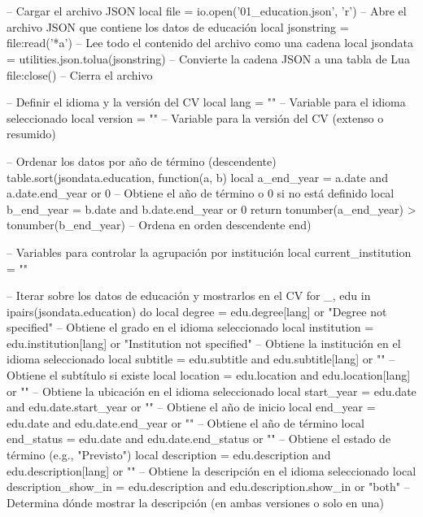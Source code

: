\section*{\educationTitle} %
\vspace{-20pt}
\noindent\makebox[\linewidth]{\rule{\textwidth}{0.4pt}} %
\vspace{-10pt}

\setlength{\leftskip}{0pt} %
\setlength{\rightskip}{0pt plus 1fil} %
\raggedright %

\begin{luacode}
-- Cargar el archivo JSON
local file = io.open('01_education.json', 'r') -- Abre el archivo JSON que contiene los datos de educación
local jsonstring = file:read('*a') -- Lee todo el contenido del archivo como una cadena
local jsondata = utilities.json.tolua(jsonstring) -- Convierte la cadena JSON a una tabla de Lua
file:close() -- Cierra el archivo

-- Definir el idioma y la versión del CV
local lang = "\cvLang" -- Variable para el idioma seleccionado
local version = "\cvVersion" -- Variable para la versión del CV (extenso o resumido)

-- Ordenar los datos por año de término (descendente)
table.sort(jsondata.education, function(a, b)
    local a_end_year = a.date and a.date.end_year or 0 -- Obtiene el año de término o 0 si no está definido
    local b_end_year = b.date and b.date.end_year or 0
    return tonumber(a_end_year) > tonumber(b_end_year) -- Ordena en orden descendente
end)

-- Variables para controlar la agrupación por institución
local current_institution = ""

-- Iterar sobre los datos de educación y mostrarlos en el CV
for _, edu in ipairs(jsondata.education) do
    local degree = edu.degree[lang] or "Degree not specified" -- Obtiene el grado en el idioma seleccionado
    local institution = edu.institution[lang] or "Institution not specified" -- Obtiene la institución en el idioma seleccionado
    local subtitle = edu.subtitle and edu.subtitle[lang] or "" -- Obtiene el subtítulo si existe
    local location = edu.location and edu.location[lang] or "" -- Obtiene la ubicación en el idioma seleccionado
    local start_year = edu.date and edu.date.start_year or "" -- Obtiene el año de inicio
    local end_year = edu.date and edu.date.end_year or "" -- Obtiene el año de término
    local end_status = edu.date and edu.date.end_status or "" -- Obtiene el estado de término (e.g., "Previsto")
    local description = edu.description and edu.description[lang] or "" -- Obtiene la descripción en el idioma seleccionado
    local description_show_in = edu.description and edu.description.show_in or "both" -- Determina dónde mostrar la descripción (en ambas versiones o solo en una)


\end{luacode}
